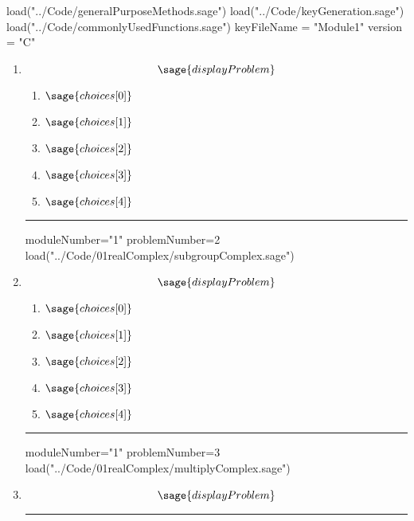 \documentclass[14pt]{extbook}
\newcommand{\litem}[1]{\item#1\hspace*{-1cm}\rule{\textwidth}{0.4pt}}
\begin{document}
\pagestyle{fancy}

\begin{sagesilent}
load("../Code/generalPurposeMethods.sage")
load("../Code/keyGeneration.sage")
load("../Code/commonlyUsedFunctions.sage")
keyFileName = "Module1"
version = "C"
\end{sagesilent}

\begin{enumerate}

\begin{sagesilent}
moduleNumber="1"
problemNumber=1
load("../Code/01realComplex/orderOfOperations.sage")
\end{sagesilent}

\litem{ 

   \[ \sage{displayProblem} \]

  	\begin{enumerate}[label=\Alph*.]
    \item \( \sage{choices[0]} \)
    \item \( \sage{choices[1]} \)
    \item \( \sage{choices[2]} \)
    \item \( \sage{choices[3]} \)
    \item \( \sage{choices[4]} \)
  	\end{enumerate}
  }
\begin{sagesilent}
moduleNumber="1"
problemNumber=2
load("../Code/01realComplex/subgroupComplex.sage")
\end{sagesilent}

\litem{ 

   \[ \sage{displayProblem} \]

  	\begin{enumerate}[label=\Alph*.]
    \item \( \sage{choices[0]} \)
    \item \( \sage{choices[1]} \)
    \item \( \sage{choices[2]} \)
    \item \( \sage{choices[3]} \)
    \item \( \sage{choices[4]} \)
  	\end{enumerate}
  }
\begin{sagesilent}
moduleNumber="1"
problemNumber=3
load("../Code/01realComplex/multiplyComplex.sage")
\end{sagesilent}

\litem{ 

   \[ \sage{displayProblem} \]

}
\end{enumerate}
\end{document}
